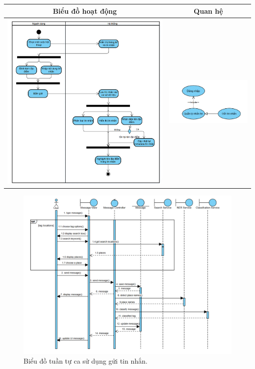 \noindent 
\begin{tabular}{| c | c |}
    \hline
    \textbf{Biểu đồ hoạt động} & \textbf{Quan hệ} \\ 
    \hline
    \includegraphics[width=0.5\linewidth]{figures/c3/3-3-9-ad.png} 
    & 
    \includegraphics[width=0.45\linewidth]{figures/c3/3-3-9-rd.png} \\ 
    \hline
\end{tabular}


\vspace{0.8cm}

\begin{figure}[H]
    \centering  
    \includegraphics[width=1\textwidth]{figures/c3/3-3-9-sd.png}
    \caption{Biểu đồ tuần tự ca sử dụng gửi tin nhắn.}
    \label{fig:3-3-9-sequence-diagram}
\end{figure}